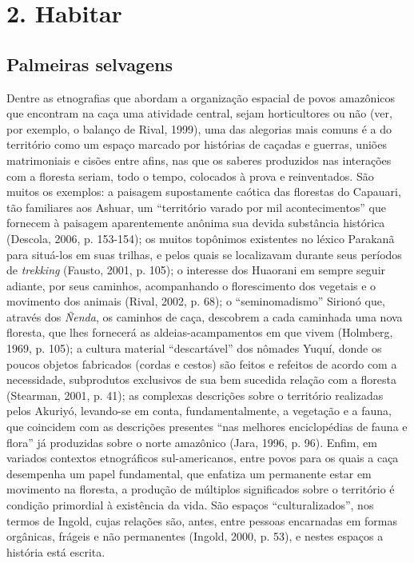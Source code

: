 
\chapter{2. Habitar}\label{habitar}

\section{Palmeiras selvagens}

Dentre as etnografias que abordam a organização espacial de povos
amazônicos que encontram na caça uma atividade central, sejam
horticultores ou não (ver, por exemplo, o balanço de Rival, 1999), uma
das alegorias mais comuns é a do território como um espaço marcado por
histórias de caçadas e guerras, uniões matrimoniais e cisões entre
afins, nas que os saberes produzidos nas interações com a floresta
seriam, todo o tempo, colocados à prova e reinventados. São muitos os
exemplos: a paisagem supostamente caótica das florestas do Capauari, tão
familiares aos Ashuar, um ``território varado por mil acontecimentos''
que fornecem à paisagem aparentemente anônima sua devida substância
histórica (Descola, 2006, p. 153-154); os muitos topônimos existentes no
léxico Parakanã para situá-los em suas trilhas, e pelos quais se
localizavam durante seus períodos de \emph{trekking} (Fausto, 2001, p.
105); o interesse dos Huaorani em sempre seguir adiante, por seus
caminhos, acompanhando o florescimento dos vegetais e o movimento dos
animais (Rival, 2002, p. 68); o ``seminomadismo'' Sirionó que, através
dos \emph{Ñenda}, os caminhos de caça, descobrem a cada caminhada uma
nova floresta, que lhes fornecerá as aldeias-acampamentos em que vivem
(Holmberg, 1969, p. 105); a cultura material ``descartável'' dos nômades
Yuquí, donde os poucos objetos fabricados (cordas e cestos) são feitos e
refeitos de acordo com a necessidade, subprodutos exclusivos de sua bem
sucedida relação com a floresta (Stearman, 2001, p. 41); as complexas
descrições sobre o território realizadas pelos Akuriyó, levando-se em
conta, fundamentalmente, a vegetação e a fauna, que coincidem com as
descrições presentes ``nas melhores enciclopédias de fauna e flora'' já
produzidas sobre o norte amazônico (Jara, 1996, p. 96). Enfim, em
variados contextos etnográficos sul-americanos, entre povos para os
quais a caça desempenha um papel fundamental, que enfatiza um permanente
estar em movimento na floresta, a produção de múltiplos significados
sobre o território é condição primordial à existência da vida. São
espaços ``culturalizados'', nos termos de Ingold, cujas relações são,
antes, entre pessoas encarnadas em formas orgânicas, frágeis e não
permanentes (Ingold, 2000, p. 53), e nestes espaços a história está
escrita.

